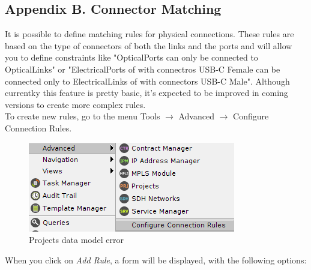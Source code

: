 \documentclass[a4paper]{article}
\begin{document}
\begin{appendices}
			\section{Appendix B. Connector Matching} \label{app:AppendixB}
			It is possible to define matching rules for physical connections. These rules are based on the type of connectors of both the links and the ports and will allow you to define constraints like "OpticalPorts can only be connected to OpticalLinks" or "ElectricalPorts of with connectros USB-C Female can be connected only to ElectricalLinks of with connectors USB-C Male". Although currentky this feature is pretty basic, it's expected to be improved in coming versions to create more complex rules.\\
			To create new rules, go to the menu Tools $\rightarrow$ Advanced $\rightarrow$ Configure Connection Rules.\\
			\begin{figure}[h!]
				\centering
				\includegraphics[width=0.6\linewidth]{img/appendix_b_connector_matching_menu.png}
				\caption{Projects data model error}
				\label{fig:connector_rules_menu}
			\end{figure}
			When you click on \textit{Add Rule}, a form will be displayed, with the following options:
			

\end{appendices}
\end{document}
